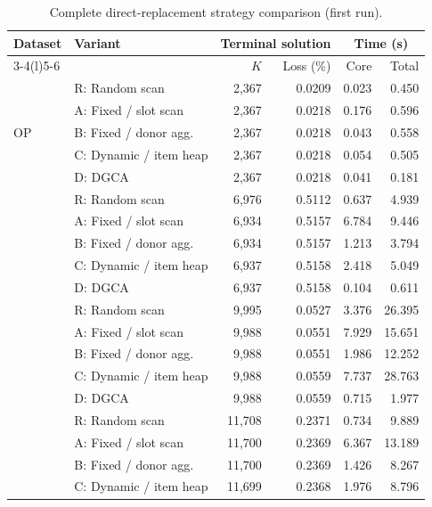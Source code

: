 \begin{table}[t]
\centering
\caption{Complete direct-replacement strategy comparison (first run).}
\label{tab:T05_strategy_full}
\small
\setlength{\tabcolsep}{4pt}
\begin{tabular*}{\textwidth}{@{\extracolsep{\fill}}llrrrr@{}}
\toprule
\multirow{2}{*}{Dataset} & \multirow{2}{*}{Variant} & \multicolumn{2}{c}{Terminal solution} & \multicolumn{2}{c}{Time (s)} \\
\cmidrule(lr){3-4}\cmidrule(l){5-6}
 &  & $K$ & Loss (\%) & Core & Total \\
\midrule
\multirow{5}{*}{OP} & R: Random scan & 2,367 & 0.0209 & 0.023 & 0.450 \\
 & A: Fixed / slot scan & 2,367 & 0.0218 & 0.176 & 0.596 \\
 & B: Fixed / donor agg. & 2,367 & 0.0218 & 0.043 & 0.558 \\
 & C: Dynamic / item heap & 2,367 & 0.0218 & 0.054 & 0.505 \\
 & D: DGCA & 2,367 & 0.0218 & 0.041 & 0.181 \\
\addlinespace[4pt]
\multirow{5}{*}{Yelp} & R: Random scan & 6,976 & 0.5112 & 0.637 & 4.939 \\
 & A: Fixed / slot scan & 6,934 & 0.5157 & 6.784 & 9.446 \\
 & B: Fixed / donor agg. & 6,934 & 0.5157 & 1.213 & 3.794 \\
 & C: Dynamic / item heap & 6,937 & 0.5158 & 2.418 & 5.049 \\
 & D: DGCA & 6,937 & 0.5158 & 0.104 & 0.611 \\
\addlinespace[4pt]
\multirow{5}{*}{VG} & R: Random scan & 9,995 & 0.0527 & 3.376 & 26.395 \\
 & A: Fixed / slot scan & 9,988 & 0.0551 & 7.929 & 15.651 \\
 & B: Fixed / donor agg. & 9,988 & 0.0551 & 1.986 & 12.252 \\
 & C: Dynamic / item heap & 9,988 & 0.0559 & 7.737 & 28.763 \\
 & D: DGCA & 9,988 & 0.0559 & 0.715 & 1.977 \\
\addlinespace[4pt]
\multirow{5}{*}{TG} & R: Random scan & 11,708 & 0.2371 & 0.734 & 9.889 \\
 & A: Fixed / slot scan & 11,700 & 0.2369 & 6.367 & 13.189 \\
 & B: Fixed / donor agg. & 11,700 & 0.2369 & 1.426 & 8.267 \\
 & C: Dynamic / item heap & 11,699 & 0.2368 & 1.976 & 8.796 \\

\end{tabular*}
\end{table}
